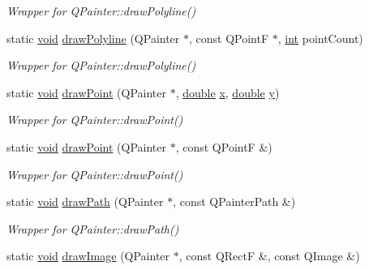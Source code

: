 \begin{DoxyCompactItemize}
\begin{DoxyCompactList}\small\item\em Wrapper for Q\-Painter\-::draw\-Polyline() \end{DoxyCompactList}\item 
static \hyperlink{group___u_a_v_objects_plugin_ga444cf2ff3f0ecbe028adce838d373f5c}{void} \hyperlink{class_qwt_painter_a2aac8306cd6863887db1f2987eb0eced}{draw\-Polyline} (Q\-Painter $\ast$, const Q\-Point\-F $\ast$, \hyperlink{ioapi_8h_a787fa3cf048117ba7123753c1e74fcd6}{int} point\-Count)
\begin{DoxyCompactList}\small\item\em Wrapper for Q\-Painter\-::draw\-Polyline() \end{DoxyCompactList}\item 
static \hyperlink{group___u_a_v_objects_plugin_ga444cf2ff3f0ecbe028adce838d373f5c}{void} \hyperlink{class_qwt_painter_a1e65c0e2436e253de937e164d365aa5f}{draw\-Point} (Q\-Painter $\ast$, \hyperlink{_super_l_u_support_8h_a8956b2b9f49bf918deed98379d159ca7}{double} \hyperlink{glext_8h_a1db9d104e3c2128177f26aff7b46982f}{x}, \hyperlink{_super_l_u_support_8h_a8956b2b9f49bf918deed98379d159ca7}{double} \hyperlink{glext_8h_a42315f3ed8fff752bb47fd782309fcfc}{y})
\begin{DoxyCompactList}\small\item\em Wrapper for Q\-Painter\-::draw\-Point() \end{DoxyCompactList}\item 
static \hyperlink{group___u_a_v_objects_plugin_ga444cf2ff3f0ecbe028adce838d373f5c}{void} \hyperlink{class_qwt_painter_a9b0ef616fc27c84dc7ee3cab5449a313}{draw\-Point} (Q\-Painter $\ast$, const Q\-Point\-F \&)
\begin{DoxyCompactList}\small\item\em Wrapper for Q\-Painter\-::draw\-Point() \end{DoxyCompactList}\item 
static \hyperlink{group___u_a_v_objects_plugin_ga444cf2ff3f0ecbe028adce838d373f5c}{void} \hyperlink{class_qwt_painter_a22cff4eba018aee6680c43347e92238d}{draw\-Path} (Q\-Painter $\ast$, const Q\-Painter\-Path \&)
\begin{DoxyCompactList}\small\item\em Wrapper for Q\-Painter\-::draw\-Path() \end{DoxyCompactList}\item 
static \hyperlink{group___u_a_v_objects_plugin_ga444cf2ff3f0ecbe028adce838d373f5c}{void} \hyperlink{class_qwt_painter_a2825f068a54e21e885235235daac3ec7}{draw\-Image} (Q\-Painter $\ast$, const Q\-Rect\-F \&, const Q\-Image \&)

\end{DoxyCompactItemize}
